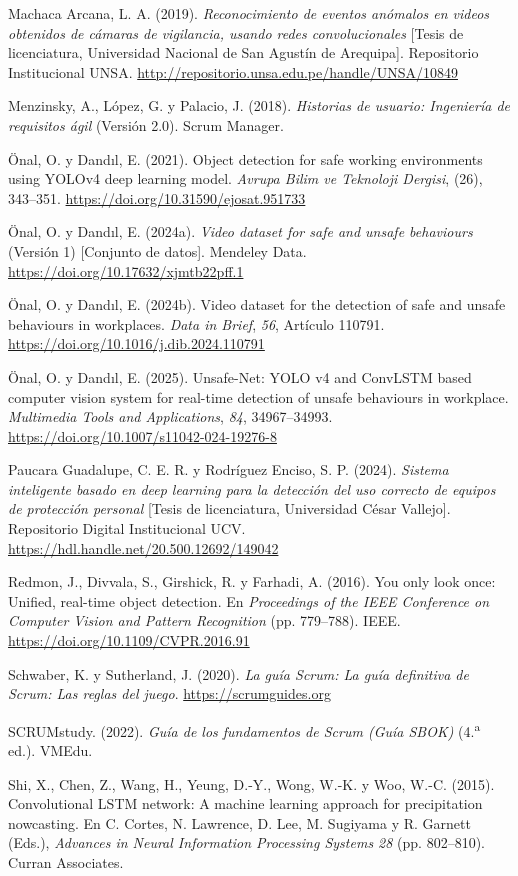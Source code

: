 \documentclass[12pt,a4paper]{article}
\newenvironment{referencias}{\par\setlength{\parindent}{0pt}\singlespacing
  \setlength{\parskip}{8pt}\everypar{\hangindent=1.27cm\hangafter=1}}{\par}
\begin{document}
\begin{referencias}
Machaca Arcana, L. A. (2019). \textit{Reconocimiento de eventos anómalos en videos obtenidos de cámaras de vigilancia, usando redes convolucionales} [Tesis de licenciatura, Universidad Nacional de San Agustín de Arequipa]. Repositorio Institucional UNSA. \url{http://repositorio.unsa.edu.pe/handle/UNSA/10849}

Menzinsky, A., López, G. y Palacio, J. (2018). \textit{Historias de usuario: Ingeniería de requisitos ágil} (Versión 2.0). Scrum Manager.

Önal, O. y Dandıl, E. (2021). Object detection for safe working environments using YOLOv4 deep learning model. \textit{Avrupa Bilim ve Teknoloji Dergisi}, (26), 343--351. \url{https://doi.org/10.31590/ejosat.951733}

Önal, O. y Dandıl, E. (2024a). \textit{Video dataset for safe and unsafe behaviours} (Versión 1) [Conjunto de datos]. Mendeley Data. \url{https://doi.org/10.17632/xjmtb22pff.1}

Önal, O. y Dandıl, E. (2024b). Video dataset for the detection of safe and unsafe behaviours in workplaces. \textit{Data in Brief}, \textit{56}, Artículo 110791. \url{https://doi.org/10.1016/j.dib.2024.110791}

Önal, O. y Dandıl, E. (2025). Unsafe-Net: YOLO v4 and ConvLSTM based computer vision system for real-time detection of unsafe behaviours in workplace. \textit{Multimedia Tools and Applications}, \textit{84}, 34967--34993. \url{https://doi.org/10.1007/s11042-024-19276-8}

Paucara Guadalupe, C. E. R. y Rodríguez Enciso, S. P. (2024). \textit{Sistema inteligente basado en deep learning para la detección del uso correcto de equipos de protección personal} [Tesis de licenciatura, Universidad César Vallejo]. Repositorio Digital Institucional UCV. \url{https://hdl.handle.net/20.500.12692/149042}

Redmon, J., Divvala, S., Girshick, R. y Farhadi, A. (2016). You only look once: Unified, real-time object detection. En \textit{Proceedings of the IEEE Conference on Computer Vision and Pattern Recognition} (pp. 779--788). IEEE. \url{https://doi.org/10.1109/CVPR.2016.91}

Schwaber, K. y Sutherland, J. (2020). \textit{La guía Scrum: La guía definitiva de Scrum: Las reglas del juego}. \url{https://scrumguides.org}

SCRUMstudy. (2022). \textit{Guía de los fundamentos de Scrum (Guía SBOK)} (4.\textsuperscript{a} ed.). VMEdu.

Shi, X., Chen, Z., Wang, H., Yeung, D.-Y., Wong, W.-K. y Woo, W.-C. (2015). Convolutional LSTM network: A machine learning approach for precipitation nowcasting. En C. Cortes, N. Lawrence, D. Lee, M. Sugiyama y R. Garnett (Eds.), \textit{Advances in Neural Information Processing Systems 28} (pp. 802--810). Curran Associates.

\end{referencias}
\end{document}
